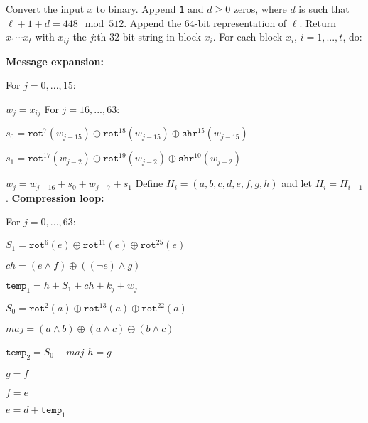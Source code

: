 \documentclass[a4paper,12pt]{article}
\begin{document}
Convert the input $x$ to binary. Append \texttt{1} and $d \geq 0$ zeros, where $d$ is such that $\ell+1+d = 448 \mod 512$. Append the $64$-bit representation of $\ell$. Return $x_1 \cdots x_t$ with $x_{ij}$ the $j$:th 32-bit string in block $x_i$.
\newline
\newline
\noindent
For each block $x_i$, $i=1,...,t$, do:
\newline

\indent \textbf{Message expansion:}

\indent For $j=0,...,15$:

\indent \indent $w_j = x_{ij}$
\newline
\newline
\indent For $j=16,...,63$:

\indent \indent $s_0 = \texttt{rot}^7(w_{j-15}) \oplus \texttt{rot}^{18}(w_{j-15}) \oplus \texttt{shr}^{15}(w_{j-15})$

\indent \indent $s_1 = \texttt{rot}^{17}(w_{j-2}) \oplus \texttt{rot}^{19}(w_{j-2}) \oplus \texttt{shr}^{10}(w_{j-2})$

\indent \indent $w_j = w_{j-16}+s_0+w_{j-7}+s_1$
\newline
\newline
\indent Define $H_i = (a,b,c,d,e,f,g,h)$ and let $H_i = H_{i-1}$.
\newline
\newline
\indent \textbf{Compression loop:}

\indent For $j=0,...,63$:

\indent \indent $S_1 = \texttt{rot}^6(e) \oplus \texttt{rot}^{11}(e) \oplus \texttt{rot}^{25}(e)$

\indent \indent $ch = (e \land f) \oplus ((\neg e) \land g)$

\indent \indent $\texttt{temp}_1 = h+S_1+ch+k_j+w_j$

\indent \indent $S_0 =  \texttt{rot}^2(a) \oplus \texttt{rot}^{13}(a) \oplus \texttt{rot}^{22}(a)$

\indent \indent $maj = (a\land b) \oplus (a \land c) \oplus (b \land c)$

\indent \indent $\texttt{temp}_2 = S_0+maj$
\newline
\newline
\indent \indent $h=g$

\indent \indent $g=f$

\indent \indent $f=e$

\indent \indent $e = d+\texttt{temp}_1$
\end{document}
